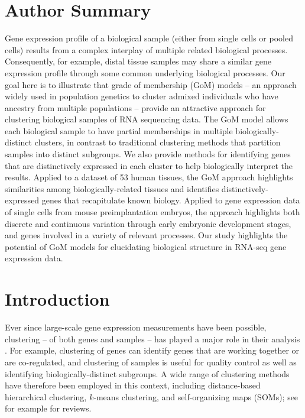 \documentclass[10pt,letterpaper]{article}
\begin{document}
\section*{Author Summary}
Gene expression profile of a biological sample (either from single cells or pooled cells) results from a complex interplay of multiple related biological processes. Consequently, for example, distal tissue samples may share a similar gene expression profile through some common underlying biological processes. Our goal here is to illustrate that grade of membership (GoM) models -- an approach widely used in population genetics to cluster admixed individuals who have ancestry from multiple populations -- provide an attractive approach for clustering biological samples of RNA sequencing data. The GoM model allows each biological sample to have partial memberships in multiple biologically-distinct clusters, in contrast to traditional clustering methods that partition samples into distinct subgroups. We also provide methods for identifying genes that are distinctively expressed in each cluster to help biologically interpret the results. Applied to a dataset of 53 human tissues, the GoM approach highlights similarities among biologically-related tissues and identifies distinctively-expressed genes that recapitulate known biology. Applied to gene expression data of single cells from mouse preimplantation embryos, the approach highlights both discrete and continuous variation through early embryonic development stages, and genes involved in a variety of relevant processes. Our study highlights the potential of GoM models for elucidating biological structure in RNA-seq gene expression data.
\linenumbers


\section*{Introduction}

Ever since large-scale gene expression measurements have been possible, clustering -- of both genes and samples --
has played a major role in their analysis \cite{Alizadeh2000, Eisen1998, Golub1999}.
For example, clustering of genes can identify genes that are working together or are co-regulated, and clustering of samples is useful for quality control
as well as identifying biologically-distinct subgroups. A wide range of clustering methods have therefore
been employed in this context, including distance-based hierarchical clustering, $k$-means clustering, and self-organizing maps (SOMs); see for example \cite{D'haeseleer2005, Jiang2004} for reviews.
\end{document}
